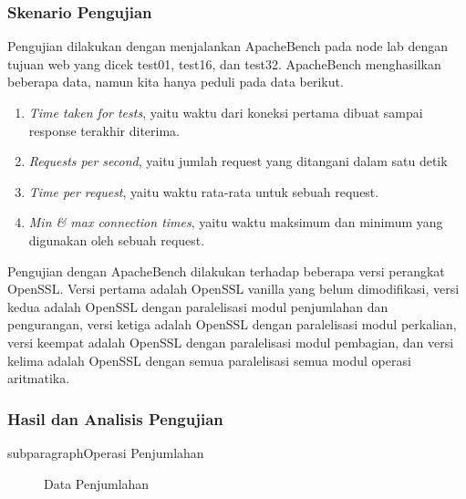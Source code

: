 \subsubsection{Skenario Pengujian}
Pengujian dilakukan dengan menjalankan ApacheBench pada node lab dengan tujuan web yang dicek test01, test16, dan test32. ApacheBench menghasilkan beberapa data, namun kita hanya peduli pada data berikut.
\begin{enumerate}[label=\roman*.]
  \item \textit{Time taken for tests}, yaitu waktu dari koneksi pertama dibuat sampai response terakhir diterima.
  \item \textit{Requests per second}, yaitu jumlah request yang ditangani dalam satu detik
  \item \textit{Time per request}, yaitu waktu rata-rata untuk sebuah request.
  \item \textit{Min \& max connection times}, yaitu waktu maksimum dan minimum yang digunakan oleh sebuah request.
\end{enumerate}

Pengujian dengan ApacheBench dilakukan terhadap beberapa versi perangkat OpenSSL. Versi pertama adalah OpenSSL vanilla yang belum dimodifikasi, versi kedua adalah OpenSSL dengan paralelisasi modul penjumlahan dan pengurangan, versi ketiga adalah OpenSSL dengan paralelisasi modul perkalian, versi keempat adalah OpenSSL dengan paralelisasi modul pembagian, dan versi kelima adalah OpenSSL dengan semua paralelisasi semua modul operasi aritmatika.

\subsubsection{Hasil dan Analisis Pengujian}

subparagraph{Operasi Penjumlahan}
\begin{figure}
  \centering
  \caption{Data Penjumlahan}
  \label{fig:add_data}
\end{figure}

